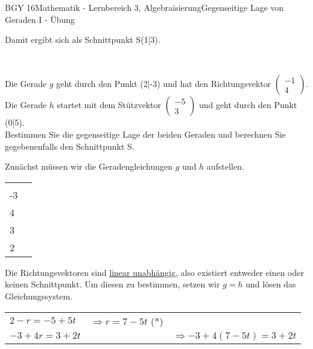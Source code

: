 \documentclass[oneside,openany,headings=optiontotoc,11pt,numbers=noenddot]{scrreprt}
\begin{document}
\begin{worksheet}{BGY 16}{Mathematik - Lernbereich 3, Algebraisierung}{Gegenseitige Lage von Geraden I - Übung}
\begin{framed}
			\par\noindent
			Damit ergibt sich als Schnittpunkt S(1|3).
			\\
			\par\noindent
			\hdashrule[0.5ex][x]{\textwidth}{0.1mm}{8mm 2pt}\\
			\par\noindent
			Die Gerade \(g\) geht durch den Punkt (2|-3) und hat den Richtungsvektor \(\left(\begin{array}{c}-1\\4\end{array}\right)\). Die Gerade \(h\) startet mit dem Stützvektor \(\left(\begin{array}{c}-5\\3\end{array}\right)\) und geht durch den Punkt (0|5).\\
			Bestimmen Sie die gegenseitige Lage der beiden Geraden und berechnen Sie gegebenenfalls den Schnittpunkt S.\\
			\par\noindent
			Zunächst müssen wir die Geradengleichungen \(g\) und \(h\) aufstellen.\\
			\begin{tabularx}{\textwidth}{XX}
				\(g: \vec{x} = \left(\begin{array}{c}2\\-3\end{array}\right) + r\left(\begin{array}{c}-1\\4\end{array}\right)\) & \(h: \vec{x} = \left(\begin{array}{c}-5\\3\end{array}\right) + t\left(\begin{array}{c}5\\2\end{array}\right)\)
			\end{tabularx}
			Die Richtungsvektoren sind \color{blue}\underline{linear unabhängig}\normalcolor{}, also existiert entweder \color{red}einen\normalcolor{} oder \color{red}keinen\normalcolor{} Schnittpunkt. Um diesen zu bestimmen, setzen wir \(g=h\) und lösen das Gleichungssystem.\\
			\par\noindent
			\begin{tabular}{lll}
				\(2-r = -5 +5t\) & \(\Rightarrow r = 7-5t\) (*) &\\
				\(-3 +4r = 3+2t\) & & \(\Rightarrow -3 +4(7-5t) = 3+2t\)\\ 

\end{tabular}
\end{framed}
\end{worksheet}
\end{document}
